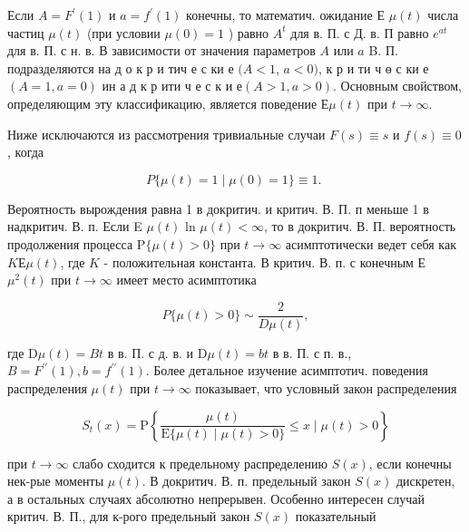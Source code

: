\documentclass[10pt]{article}
\begin{document}
Если $A=F^{\prime}(1)$ и $a=f^{\prime}(1)$ конечны, то математич. ожидание Е $\mu(t)$ числа частиц $\mu(t)$ (при условии $\mu(0)=1$ ) равно $A^{t}$ для в. П. с Д. в. П равно $e^{a t}$ для в. П. с н. в. В зависимости от значения параметров $A$ или $a$ B. П. подразделяются на д о к р и тич е с ки е $(A<1$, $a<0)$, к р и ти ч ө с ки е $(A=1, a=0)$ ин а д к р ити ч е с к и $е(A>1, a>0)$. Основным свойством, определяющим эту классификацию, является поведение $Е \mu(t)$ при $t \rightarrow \infty$.



Ниже исключаются из рассмотрения тривиальные случаи $F(s) \equiv s$ и $f(s) \equiv 0$, когда



\[

P\{\mu(t)=1 \mid \mu(0)=1\} \equiv 1 \text {. }

\]



Вероятность вырождения равна 1 в докритич. и критич. В. П. п меньше 1 в надкритич. В. п. Если E $\mu(t)$ ln $\mu(t)<\infty$, то в докритич. В. П. вероятность продолжения процесса $\mathrm{P}\{\mu(t)>0\}$ при $t \rightarrow \infty$ асимптотически ведет себя как $K Е \mu(t)$, где $K$ - положительная константа. В критич. В. п. с конечным Е $\mu^{2}(t)$ при $t \rightarrow \infty$ имеет место асимптотика



\[

P\{\mu(t)>0\} \sim \frac{2}{D \mu(t)},

\]



где $\mathrm{D} \mu(t)=B t$ в в. П. с д. в. и $\mathrm{D} \mu(t)=b t$ в в. П. с п. в., $B=F^{\prime \prime}(1), b=f^{\prime \prime}(1)$. Более детальное изучение асимптотич. поведения распределения $\mu(t)$ при $t \rightarrow \infty$ показывает, что условный закон распределения



\[

S_{t}(x)=\mathrm{P}\left\{\frac{\mu(t)}{\mathrm{E}\{\mu(t) \mid \mu(t)>0\}} \leqslant x \mid \mu(t)>0\right\}

\]



при $t \rightarrow \infty$ слабо сходится к предельному распределению $S(x)$, если конечны нек-рые моменты $\mu(t)$. В докритич. В. п. предельный закон $S(x)$ дискретен, а в остальных случаях абсолютно непрерывен. Особенно интересен случай критич. В. П., для к-рого предельный закон $S(x)$ показательный
\end{document}
